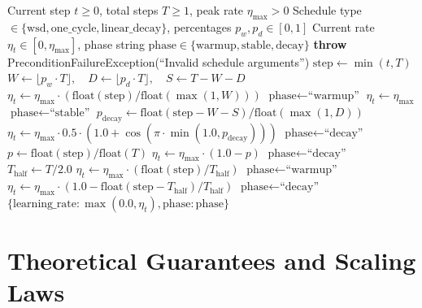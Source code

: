 \documentclass[11pt,a4paper]{article}
\theoremstyle{definition}
\begin{document}
\begin{algorithm}[H]
\caption{WSD / 1-Cycle Schedule Computation}
\begin{algorithmic}[1]
\Require Current step $t \ge 0$, total steps $T \ge 1$, peak rate $\eta_{\max} > 0$
\Require Schedule type $\in \{\text{wsd}, \text{one\_cycle}, \text{linear\_decay}\}$, percentages $p_w, p_d \in [0, 1]$
\Ensure Current rate $\eta_t \in [0, \eta_{\max}]$, phase string $\text{phase} \in \{\text{warmup}, \text{stable}, \text{decay}\}$
    \State \textbf{throw} PreconditionFailureException(``Invalid schedule arguments'')
\EndIf
\State $\text{step} \gets \min(t, T)$
    \State $W \gets \lfloor p_w \cdot T \rfloor, \quad D \gets \lfloor p_d \cdot T \rfloor, \quad S \gets T - W - D$
        \State $\eta_t \gets \eta_{\max} \cdot (\text{float}(\text{step}) / \text{float}(\max(1, W)))$
        \State $\text{phase} \gets \text{``warmup''}$
        \State $\eta_t \gets \eta_{\max}$
        \State $\text{phase} \gets \text{``stable''}$
    \Else
        \State $p_{\text{decay}} \gets \text{float}(\text{step} - W - S) / \text{float}(\max(1, D))$
        \State $\eta_t \gets \eta_{\max} \cdot 0.5 \cdot (1.0 + \cos(\pi \cdot \min(1.0, p_{\text{decay}})))$
        \State $\text{phase} \gets \text{``decay''}$
    \EndIf
{}
    \State $p \gets \text{float}(\text{step}) / \text{float}(T)$
    \State $\eta_t \gets \eta_{\max} \cdot (1.0 - p)$
    \State $\text{phase} \gets \text{``decay''}$
    \State $T_{\text{half}} \gets T / 2.0$
        \State $\eta_t \gets \eta_{\max} \cdot (\text{float}(\text{step}) / T_{\text{half}})$
        \State $\text{phase} \gets \text{``warmup''}$
    \Else
        \State $\eta_t \gets \eta_{\max} \cdot (1.0 - \text{float}(\text{step} - T_{\text{half}}) / T_{\text{half}})$
        \State $\text{phase} \gets \text{``decay''}$
    \EndIf
\EndIf
\State \Return $\{\text{learning\_rate}: \max(0.0, \eta_t), \text{phase}: \text{phase}\}$
\end{algorithmic}
\end{algorithm}

\section{Theoretical Guarantees and Scaling Laws}
\end{document}
